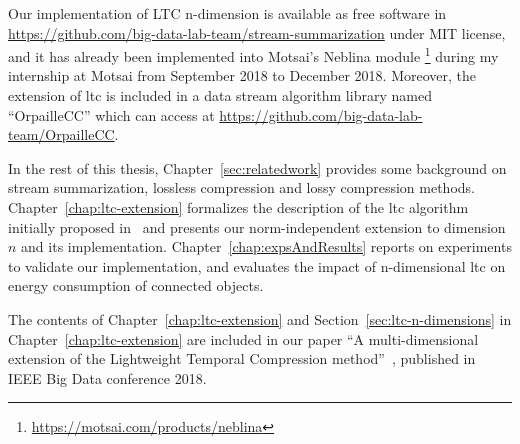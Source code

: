 Our implementation of LTC n-dimension is available as free software in
\url{https://github.com/big-data-lab-team/stream-summarization} under MIT
license, and it has already been implemented into Motsai's Neblina module
\footnote{\url{https://motsai.com/products/neblina}} during my internship at
Motsai from September 2018 to December 2018.  Moreover, the extension of
\acrshort{ltc} is included in a data stream algorithm library named
``OrpailleCC'' which can access at
\url{https://github.com/big-data-lab-team/OrpailleCC}.



In the rest of this thesis, Chapter~\ref{sec:relatedwork} provides some
background on stream summarization, lossless compression and lossy compression
methods. Chapter~\ref{chap:ltc-extension} formalizes the description of the
\acrshort{ltc} algorithm initially proposed
in~\cite{schoellhammer2004lightweight} and presents our norm-independent
extension to dimension $n$ and its implementation.
Chapter~\ref{chap:expsAndResults} reports on experiments to validate our
implementation, and evaluates the impact of n-dimensional \acrshort{ltc} on
energy consumption of connected objects.

The contents of Chapter~\ref{chap:ltc-extension} and
Section~\ref{sec:ltc-n-dimensions} in Chapter~\ref{chap:ltc-extension} are
included in our paper ``A multi-dimensional extension of the Lightweight
Temporal Compression method''~\cite{li2018multi}, published in IEEE Big Data
conference 2018.


